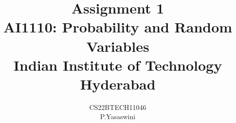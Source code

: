 \documentclass[journal,12pt,twocolumn]{IEEEtran}
\begin{document}
\let\vec\mathbf


\vspace{3cm}

\title{
\textbf{Assignment 1}\\ \textbf{AI1110}: Probability and Random Variables\\Indian Institute of Technology Hyderabad
	}

\author{CS22BTECH11046\\P.Yasaswini}	
 




\maketitle

\newpage


\bigskip

\renewcommand{\thefigure}{\theenumi}
\renewcommand{\thetable}{\theenumi}
\end{document}
